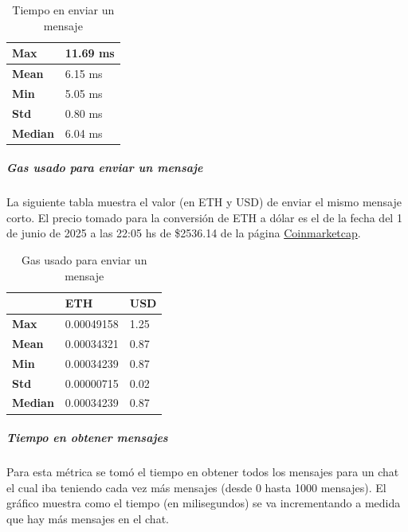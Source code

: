 \setlength\tabcolsep{1pt}
\begin{table}[!htbp]
    \centering
    \begin{tabular}{|m{5em}|m{5em}|}
    \hline
    \textbf{Max} & 11.69 ms \\
    \hline
    \textbf{Mean} & 6.15 ms \\
    \hline
    \textbf{Min} & 5.05 ms \\
    \hline
    \textbf{Std} & 0.80 ms \\
    \hline
    \textbf{Median} & 6.04 ms \\
    \hline
    \end{tabular}
    \caption{Tiempo en enviar un mensaje}
\end{table}

\subparagraph{Gas usado para enviar un mensaje}

La siguiente tabla muestra el valor (en ETH y USD) de enviar el mismo mensaje corto. El precio tomado para la conversión de ETH a dólar es el de la fecha del 1 de junio de 2025 a las 22:05 hs de \$2536.14 de la página \href{https://coinmarketcap.com/currencies/ethereum/}{Coinmarketcap}.

\setlength\tabcolsep{1pt}
\begin{table}[!htbp]
    \centering
    \begin{tabular}{|m{5em}|m{6em}|m{3em}|}
    \hline
    & \textbf{ETH} & \textbf{USD} \\
    \hline
    \textbf{Max} & 0.00049158 & 1.25 \\
    \hline
    \textbf{Mean} & 0.00034321 & 0.87 \\
    \hline
    \textbf{Min} & 0.00034239 & 0.87 \\
    \hline
    \textbf{Std} & 0.00000715 & 0.02 \\
    \hline
    \textbf{Median} & 0.00034239 & 0.87 \\
    \hline
    \end{tabular}
    \caption{Gas usado para enviar un mensaje}
\end{table}

\subparagraph{Tiempo en obtener mensajes}

Para esta métrica se tomó el tiempo en obtener todos los mensajes para un chat el cual iba teniendo cada vez más mensajes (desde 0 hasta 1000 mensajes). El gráfico muestra como el tiempo (en milisegundos) se va incrementando a medida que hay más mensajes en el chat.


